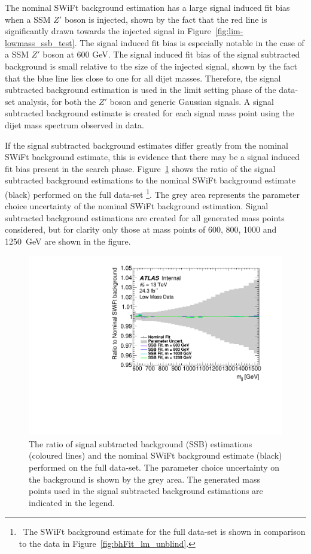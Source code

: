 The nominal SWiFt background estimation has a large signal induced fit bias when a SSM $Z'$ boson is injected,
shown by the fact that the red line is significantly drawn towards the injected signal in Figure~\ref{fig:lim-lowmass_ssb_test}.
The signal induced fit bias is especially notable in the case of a SSM $Z'$ boson at 600 GeV.
The signal induced fit bias of the signal subtracted background is small relative to the size of the injected signal,
shown by the fact that the blue line lies close to one for all dijet masses.
Therefore, the signal subtracted background estimation is used in the limit setting phase of the \lm{} data-set analysis,
for both the $Z'$ boson and generic Gaussian signals.
A signal subtracted background estimate is created for each signal mass point using the dijet mass spectrum observed in data.

If the signal subtracted background estimates differ greatly from the nominal SWiFt background estimate,
this is evidence that there may be a signal induced fit bias present in the search phase.
Figure~\ref{fig:lim-lowmass_ssb_data} shows the ratio of the 
signal subtracted background estimations to the nominal SWiFt background estimate (black) performed on the full \lm{} data-set
\footnote{\ The SWiFt background estimate for the full data-set is shown in comparison to the data in Figure~\ref{fig:bhFit_lm_unblind}.}.
The grey area represents the parameter choice uncertainty of the nominal SWiFt background estimation.
Signal subtracted background estimations are created for all \mbox{generated} mass points considered,
but for clarity only those at mass points of 600, 800, 1000 and 1250~GeV are shown in the figure.

\begin{figure}[!htb]
  \begin{center}
    \includegraphics[width=0.6\linewidth, angle=0]{figs/Dibjet/LowMass/lim-ssb_data.pdf}
  \end{center}
  \vspace{-1em}
  \caption[The ratio of signal subtracted background estimations
    and the SWiFt background estimate performed on the full \lm{} data-set.]
          {The ratio of signal subtracted background (SSB) estimations (coloured lines)
    and the nominal SWiFt background estimate (black) performed on the full \lm{} data-set.
    The parameter choice uncertainty on the background is shown by the grey area.
    The generated mass points used in the signal subtracted background estimations are indicated in the legend.}
  \label{fig:lim-lowmass_ssb_data}
\end{figure}

